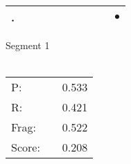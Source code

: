 \documentclass[landscape]{article}
\newcommand{\ssp}{\hspace{2pt}}
\newcommand{\mex}{\cellcolor{g}$\bullet$}
\begin{document}
\begin{tabular}{|l|p{10pt}|p{10pt}|p{10pt}|p{10pt}|p{10pt}|p{10pt}|p{10pt}|p{10pt}|p{10pt}|}
\hline
\ssp \cellcolor{ref8}. \ssp&\hspace{2pt}&\hspace{2pt}&\hspace{2pt}&\hspace{2pt}&\hspace{2pt}&\hspace{2pt}&\hspace{2pt}&\hspace{2pt}&\hspace{2pt}\mex\\
\hline
\end{tabular}

\vspace{6pt}
\noindent Segment 1\\\\
\noindent\begin{tabular}{lm{12pt}r}
\hline
P:&&0.533\\
R:&&0.421\\
Frag:&&0.522\\
Score:&&0.208\\
\end{tabular}

\newpage
\end{document}
